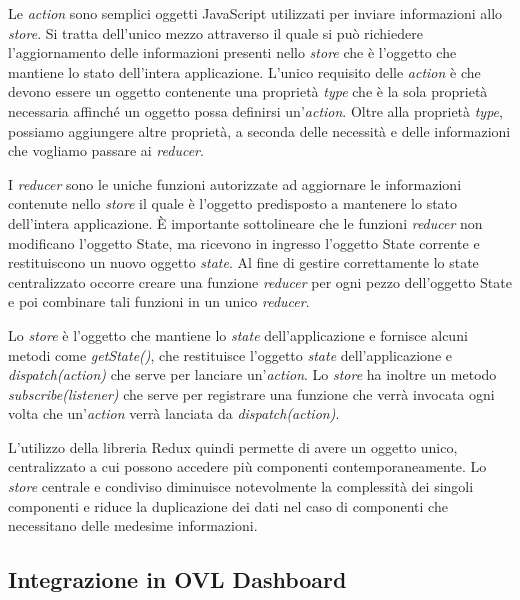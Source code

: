 Le \textit{action} sono semplici oggetti JavaScript utilizzati per inviare informazioni allo \textit{store}. Si tratta dell'unico mezzo attraverso il quale si può richiedere l'aggiornamento delle informazioni presenti nello \textit{store} che è l'oggetto che mantiene lo stato dell'intera applicazione. L'unico requisito delle \textit{action} è che devono essere un oggetto contenente una proprietà \textit{type} che è la sola proprietà necessaria affinché un oggetto possa definirsi un'\textit{action}. Oltre alla proprietà \textit{type}, possiamo aggiungere altre proprietà, a seconda delle necessità e delle informazioni che vogliamo passare ai \textit{reducer}.



I \textit{reducer} sono le uniche funzioni autorizzate ad aggiornare le informazioni contenute nello \textit{store} il quale è l'oggetto predisposto a mantenere lo stato dell'intera applicazione.
È importante sottolineare che le funzioni \textit{reducer} non modificano l'oggetto State, ma ricevono in ingresso l'oggetto State corrente e restituiscono un nuovo oggetto \textit{state}. 
Al fine di gestire correttamente lo state centralizzato occorre creare una funzione \textit{reducer} per ogni pezzo dell'oggetto State e poi combinare tali funzioni in un unico \textit{reducer}.



Lo \textit{store} è l'oggetto che mantiene lo \textit{state} dell'applicazione e fornisce alcuni metodi come \textit{getState()}, che restituisce l'oggetto \textit{state} dell'applicazione e \textit{dispatch(action)} che serve per lanciare un'\textit{action}. Lo \textit{store} ha inoltre un metodo \textit{subscribe(listener)} che serve per registrare una funzione che verrà invocata ogni volta che un'\textit{action} verrà lanciata da \textit{dispatch(action)}.

L'utilizzo della libreria Redux quindi permette di avere un oggetto unico, centralizzato a cui possono accedere più componenti contemporaneamente. Lo \textit{store} centrale e condiviso diminuisce notevolmente la complessità dei singoli componenti e riduce la duplicazione dei dati nel caso di componenti che necessitano delle medesime informazioni.

\subsection{Integrazione in OVL Dashboard}
\label{sec:integragrazione in OVL Dashboard}

